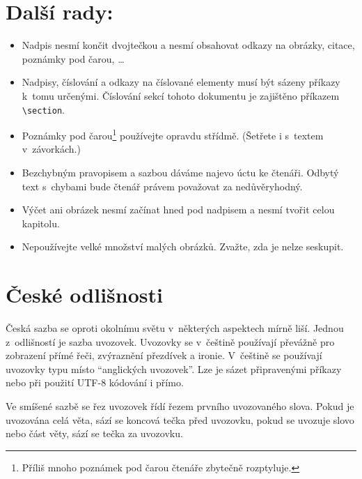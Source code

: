 \documentclass[10pt, twocolumn, a4paper]{article}
\begin{document}
\section{Další rady:}

\begin{itemize}

    \item Nadpis nesmí končit dvojtečkou a nesmí obsahovat odkazy na obrázky, citace, poznámky pod čarou, \dots

    \item Nadpisy, číslování a odkazy na číslované elementy musí být sázeny příkazy k~tomu určenými. Číslování sekcí tohoto dokumentu je zajištěno příkazem \verb|\section|.

    \item Poznámky pod čarou\footnote[1]{Příliš mnoho poznámek pod čarou čtenáře zbytečně rozptyluje.} používejte opravdu střídmě. (Šetřete i s~textem v~závorkách.)

    \item Bezchybným pravopisem a sazbou dáváme najevo úctu ke čtenáři. Odbytý text s~chybami bude čtenář právem považovat za nedůvěryhodný.

    \item Výčet ani obrázek nesmí začínat hned pod nadpisem a nesmí tvořit celou kapitolu.

    \item Nepoužívejte velké množství malých obrázků. Zvažte, zda je nelze seskupit.

\end{itemize}

\section{České odlišnosti}

Česká sazba se oproti okolnímu světu v~některých aspektech mírně liší.
Jednou z~odlišností je sazba uvozovek.
Uvozovky se v~češtině používají převážně pro zobrazení přímé řeči, zvýraznění přezdívek a ironie.
V~češtině se používají uvozovky typu  místo ``anglických uvozovek''.
Lze je sázet připravenými příkazy nebo při použití UTF-8 kódování i přímo.

Ve smíšené sazbě se řez uvozovek řídí řezem prvního uvozovaného slova.
Pokud je uvozována celá věta, sází se koncová tečka před uvozovku, pokud se uvozuje slovo nebo část věty, sází se tečka za uvozovku.
\end{document}
